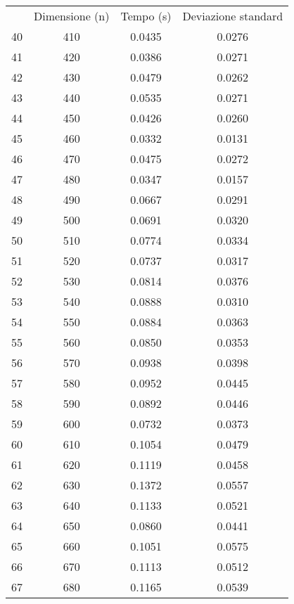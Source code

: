 \begin{table}
\centering
\begin{adjustbox}{width=1\textwidth/2}
\begin{tabular}{|c|c|c|c|}
\hline
 & Dimensione (n) & Tempo (s) & Deviazione standard \\
40 & 410 & 0.0435 & 0.0276 \\
\cline{1-4}
41 & 420 & 0.0386 & 0.0271 \\
\cline{1-4}
42 & 430 & 0.0479 & 0.0262 \\
\cline{1-4}
43 & 440 & 0.0535 & 0.0271 \\
\cline{1-4}
44 & 450 & 0.0426 & 0.0260 \\
\cline{1-4}
45 & 460 & 0.0332 & 0.0131 \\
\cline{1-4}
46 & 470 & 0.0475 & 0.0272 \\
\cline{1-4}
47 & 480 & 0.0347 & 0.0157 \\
\cline{1-4}
48 & 490 & 0.0667 & 0.0291 \\
\cline{1-4}
49 & 500 & 0.0691 & 0.0320 \\
\cline{1-4}
50 & 510 & 0.0774 & 0.0334 \\
\cline{1-4}
51 & 520 & 0.0737 & 0.0317 \\
\cline{1-4}
52 & 530 & 0.0814 & 0.0376 \\
\cline{1-4}
53 & 540 & 0.0888 & 0.0310 \\
\cline{1-4}
54 & 550 & 0.0884 & 0.0363 \\
\cline{1-4}
55 & 560 & 0.0850 & 0.0353 \\
\cline{1-4}
56 & 570 & 0.0938 & 0.0398 \\
\cline{1-4}
57 & 580 & 0.0952 & 0.0445 \\
\cline{1-4}
58 & 590 & 0.0892 & 0.0446 \\
\cline{1-4}
59 & 600 & 0.0732 & 0.0373 \\
\cline{1-4}
60 & 610 & 0.1054 & 0.0479 \\
\cline{1-4}
61 & 620 & 0.1119 & 0.0458 \\
\cline{1-4}
62 & 630 & 0.1372 & 0.0557 \\
\cline{1-4}
63 & 640 & 0.1133 & 0.0521 \\
\cline{1-4}
64 & 650 & 0.0860 & 0.0441 \\
\cline{1-4}
65 & 660 & 0.1051 & 0.0575 \\
\cline{1-4}
66 & 670 & 0.1113 & 0.0512 \\
\cline{1-4}
67 & 680 & 0.1165 & 0.0539 \\
\cline{1-4}

\end{tabular}
\end{adjustbox}
\end{table}
